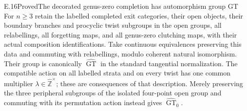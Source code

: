 \begin{result}{E.16}{Proved}{The decorated genus-zero completion has automorphism group GT}
For $n\geq3$ retain the labelled completed exit categories, their open
objects, their boundary branches and procyclic twist subgroups in the
open groups, all relabellings, all forgetting maps, and all genus-zero
clutching maps, with their actual composition identifications.  Take
continuous equivalences preserving this data and commuting with
relabellings, modulo coherent natural isomorphism.  Their group is
canonically $\widehat{\operatorname{GT}}$ in the standard tangential
normalization.  The compatible action on all labelled strata and on
every twist has one common multiplier
$\lambda\in\widehat{\mathbb Z}^{\times}$; these are consequences of
that description.  Merely preserving the three peripheral subgroups
of the isolated four-point open group and commuting with its
permutation action instead gives
$\widehat{\operatorname{GT}}_0$.
\end{result}
